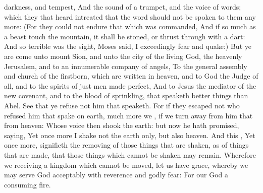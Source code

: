 {darkness,
and
tempest,
And the
sound of a
trumpet,
and the
voice of
words;
which
{} they that
heard
intreated
that the
word
should
not be
spoken to
them any more:
(For they
could
not
endure that which was
commanded, And if so much
as a
beast
touch the
mountain, it shall be
stoned,
or thrust
through with a
dart:
And
so
terrible
was the
sight,
{}
Moses
said,
I exceedingly
fear
and
quake:)
But ye are
come unto
mount
Sion,
and unto the
city of
the
living
God,
the
heavenly
Jerusalem,
and to an innumerable
company of
angels,
To the general
assembly
and
church of the
firstborn, which are
written
in
heaven,
and to
God the
Judge of
all,
and to the
spirits of just
men made
perfect,
And to
Jesus the
mediator of
the
new
covenant,
and to the
blood of
sprinkling, that
speaketh better
things
than
{}
Abel.
See
that
ye
refuse
not him that
speaketh.
For
if
they
escaped
not who
refused him that
spake
on
earth,
much
more
{}
we
{}, if we turn away
from him
that
{}
from
heaven:
Whose
voice
then
shook the
earth:
but
now he hath
promised,
saying,
Yet
once
more
I
shake
not the
earth
only,
but
also
heaven.
And
this
{},
Yet
once
more,
signifieth the
removing of those things that are
shaken,
as of things that are
made,
that those things
which
cannot be
shaken may
remain.
Wherefore we
receiving a
kingdom which cannot be
moved, let us
have
grace,
whereby we may
serve
God
acceptably
with
reverence
and godly
fear:
For
our
God
{}
a
consuming
fire.

}
